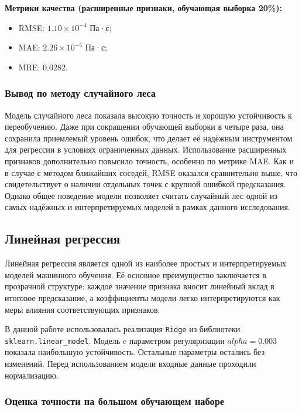 \documentclass[a4paper,12pt]{article}
\begin{document}
    \begin{minipage}{\textwidth}
      \textbf{Метрики качества (расширенные признаки, обучающая выборка 20\%):}
      \begin{itemize}
          \item RMSE: \( 1.10 \times 10^{-4} \) Па·с;
          \item MAE: \( 2.26 \times 10^{-5} \) Па·с;
          \item MRE: \( 0.0282 \).
      \end{itemize}
    \end{minipage}
    
    \subsubsection{Вывод по методу случайного леса}
    
    Модель случайного леса показала высокую точность и хорошую устойчивость к переобучению. Даже при сокращении обучающей выборки в четыре раза, она сохранила приемлемый уровень ошибок, что делает её надёжным инструментом для регрессии в условиях ограниченных данных. Использование расширенных признаков дополнительно повысило точность, особенно по метрике MAE. Как и в случае с методом ближайших соседей, RMSE оказался сравнительно выше, что свидетельствует о наличии отдельных точек с крупной ошибкой предсказания. Однако общее поведение модели позволяет считать случайный лес одной из самых надёжных и интерпретируемых моделей в рамках данного исследования.

  \subsection{Линейная регрессия}

    Линейная регрессия является одной из наиболее простых и интерпретируемых моделей машинного обучения. Её основное преимущество заключается в прозрачной структуре: каждое значение признака вносит линейный вклад в итоговое предсказание, а коэффициенты модели легко интерпретируются как меры влияния соответствующих признаков.

    В данной работе использовалась реализация \texttt{Ridge} из библиотеки \texttt{sklearn.linear\_model}. Модель c параметром регуляризации \( alpha = 0.003 \) показала наибольшую устойчивость. Остальные параметры остались без изменений. Перед использованием модели входные данные проходили нормализацию.
    
    \subsubsection{Оценка точности на большом обучающем наборе}
    
\end{document}

